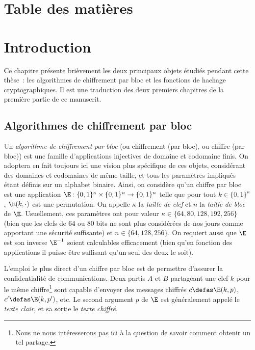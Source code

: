 

\cleardoublepage
\chapter*{Table des matières}
\parttoc


\chapter[Introduction]{Introduction}

Ce chapitre présente brièvement les deux principaux objets étudiés pendant cette thèse~: les algorithmes
de chiffrement par bloc et les fonctions de hachage cryptographiques. Il est une traduction
des deux premiers chapitres de la première partie de ce manuscrit.

\medskip

\begin{center}
\aldineleft
\end{center}

\medskip


\section{Algorithmes de chiffrement par bloc}

Un \emph{algorithme de chiffrement par bloc} (ou chiffrement (par bloc), ou chiffre (par bloc)) est une famille d'applications
injectives de domaine et codomaine finis. On adoptera en fait toujours ici une vision plus spécifique de ces objets,
considérant des domaines et codomaines de même taille, et tous les paramètres impliqués étant définis sur un alphabet
binaire. Ainsi, on considère qu'un chiffre par bloc est une application
$\E : \{0,1\}^\kappa \times \{0,1\}^n \rightarrow \{0,1\}^n$
telle que pour tout $k \in \{0,1\}^\kappa$, $\E(k,\cdot)$ est une permutation.
On appelle
$\kappa$ la \emph{taille de clef} et $n$ la \emph{taille de bloc} de $\E$. Usuellement, ces paramètres ont pour valeur
$\kappa \in \{64, 80, 128, 192, 256\}$ (bien que les clefs de 64 ou 80 bits ne sont plus considérées de nos jours
comme apportant une sécurité suffisante) et 
$n \in \{64, 128, 256\}$.
On requiert aussi que $\E$ est son inverse $\E^{-1}$ soient calculables efficacement (bien qu'en fonction des applications
il puisse être suffisant qu'un seul des deux le soit). 

L'emploi le plus direct d'un chiffre par bloc est de permettre d'assurer la confidentialité de communications.
Deux partis $A$ et $B$ partageant une clef $k$ pour le même chiffre\footnote{Nous ne nous intéresserons pas ici à la question de savoir
comment obtenir un tel partage.} sont capable d'envoyer des messages chiffrés $c \defas \E(k,p)$,
$c' \defas \E(k,p')$, etc. Le second argument $p$ de $\E$ est généralement appelé 
le \emph{texte clair}, et sa sortie le \emph{texte chiffré}.

